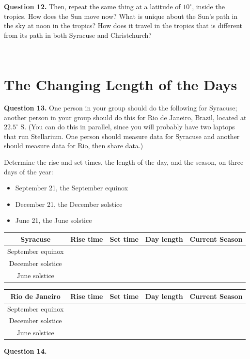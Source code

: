 \documentclass[11pt]{article}
\begin{document}
\textbf{Question 12.}
Then, repeat the same thing at a latitude of $10^\circ$, inside the tropics.
How does the Sun move now? What is unique about the Sun's path in the sky at noon in the tropics? How does it travel in the tropics that is different from its path in both Syracuse and Christchurch?

\vspace*{1.5cm}
\hrulefill\\
\newpage
\section{The Changing Length of the Days}

\textbf{Question 13.}
One person in your group should do the following for Syracuse; another person in your group should do 
this for Rio de Janeiro, Brazil, located at $22.5^\circ$ S. (You can do this in parallel, since you will probably 
have two laptops that run Stellarium. One person should measure data for Syracuse and another should measure data for Rio, then share data.) 

Determine the rise and set times, the length of the day, and the season, on three days of the year:

\begin{itemize}
\item September 21, the September equinox
\item December 21, the December solstice 
\item June 21, the June solstice 
\end{itemize}

\begin{center}


\begin{tabular}{|c| c |c|c|c|}
\hline
\Large Syracuse \normalsize
 & Rise time & Set time & Day length & Current Season\\
\hline
September equinox & & & & \\
\hline
December solstice & & & & \\
\hline
June solstice & & & & \\
\hline
\end{tabular}
\normalsize
\end{center}

\bigskip

\begin{center}
\begin{tabular}{|c| c |c|c|c|}
\hline
\Large Rio de Janeiro \normalsize
 & Rise time & Set time & Day length & Current Season\\
\hline
September equinox & & & & \\
\hline
December solstice & & & & \\
\hline
June solstice & & & & \\
\hline
\end{tabular}
\normalsize
\end{center}
\textbf{Question 14.}
\end{document}
